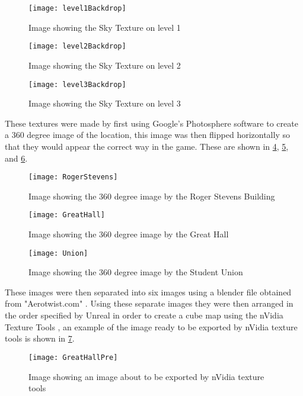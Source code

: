 \begin{figure}[H]
	\texttt{[image: level1Backdrop]}
	\centering
	\caption{Image showing the Sky Texture on level 1}
	\label{fig:level1Backdrop}
\end{figure}

\begin{figure}[H]
	\texttt{[image: level2Backdrop]}
	\centering
	\caption{Image showing the Sky Texture on level 2}
	\label{fig:level2Backdrop}
\end{figure}

\begin{figure}[H]
	\texttt{[image: level3Backdrop]}
	\centering
	\caption{Image showing the Sky Texture on level 3}
	\label{fig:level3Backdrop}
\end{figure}

These textures were made by first using Google's Photosphere software to create a 360 degree image of the location, this image was then flipped horizontally so that they would appear the correct way in the game. These are shown in \ref{fig:rogerStevens}, \ref{fig:greatHall}, and \ref{fig:union}. 

\begin{figure}[H]
	\texttt{[image: RogerStevens]}
	\centering
	\caption{Image showing the 360 degree image by the Roger Stevens Building}
	\label{fig:rogerStevens}
\end{figure}

\begin{figure}[H]
	\texttt{[image: GreatHall]}
	\centering
	\caption{Image showing the 360 degree image by the Great Hall}
	\label{fig:greatHall}
\end{figure}

\begin{figure}[H]
	\texttt{[image: Union]}
	\centering
	\caption{Image showing the 360 degree image by the Student Union}
	\label{fig:union}
\end{figure}

These images were then separated into six images using a blender file obtained from "Aerotwist.com" \cite{aerotwist}. Using these separate images they were then arranged in the order specified by Unreal in order to create a cube map using the nVidia Texture Tools \cite{unrealCubeMaps}, an example of the image ready to be exported by nVidia texture tools is shown in \ref{fig:greatHallPre}.

\begin{figure}[H]
	\texttt{[image: GreatHallPre]}
	\centering
	\caption{Image showing an image about to be exported by nVidia texture tools}
	\label{fig:greatHallPre}
\end{figure}

